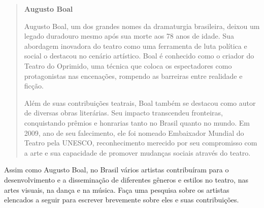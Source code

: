 \begin{quote}
\textbf{Augusto Boal}

Augusto Boal, um dos grandes nomes da dramaturgia brasileira, deixou um legado duradouro mesmo após sua morte aos 78 anos de idade. Sua abordagem inovadora do teatro como uma ferramenta de luta política e social o destacou no cenário artístico. Boal é conhecido como o criador do Teatro do Oprimido, uma técnica que coloca os espectadores como protagonistas nas encenações, rompendo as barreiras entre realidade e ficção.

Além de suas contribuições teatrais, Boal também se destacou como autor de diversas obras literárias. Seu impacto transcendeu fronteiras, conquistando prêmios e honrarias tanto no Brasil quanto no mundo. Em 2009, ano de seu falecimento, ele foi nomeado Embaixador Mundial do Teatro pela UNESCO, reconhecimento merecido por seu compromisso com a arte e sua capacidade de promover mudanças sociais através do teatro.

\end{quote}

Assim como Augusto Boal, no Brasil vários artistas contribuíram para o
desenvolvimento e a disseminação de diferentes gêneros e estilos no
teatro, nas artes visuais, na dança e na música. Faça uma pesquisa sobre os artistas elencados a seguir para escrever brevemente sobre eles e suas contribuições.

